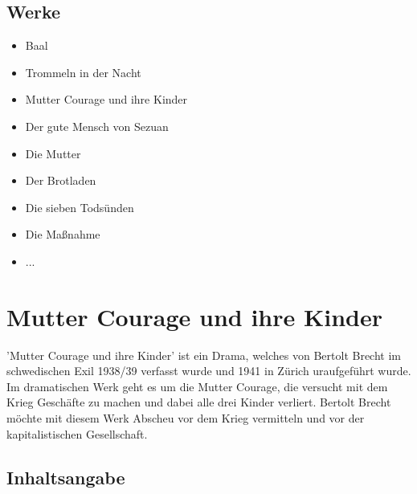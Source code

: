 \documentclass[a4paper]{article}
\begin{document}
	\subsection{Werke}

        \begin{itemize}
        \item Baal
	\item Trommeln in der Nacht
	\item Mutter Courage und ihre Kinder
        \item Der gute Mensch von Sezuan
        \item Die Mutter
        \item Der Brotladen
        \item Die sieben Todsünden
        \item Die Maßnahme
        \item ...
          
        \end{itemize}
        
        \section{Mutter Courage und ihre Kinder}

	'Mutter Courage und ihre Kinder' ist ein Drama, welches von Bertolt Brecht im schwedischen Exil 1938/39 verfasst wurde und 1941 in Zürich uraufgeführt wurde. Im dramatischen Werk geht es um die Mutter Courage, die versucht mit dem Krieg Geschäfte zu machen und dabei alle drei Kinder verliert. Bertolt Brecht möchte mit diesem Werk Abscheu vor dem Krieg vermitteln und vor der kapitalistischen Gesellschaft.
        
	\subsection{Inhaltsangabe}        
\end{document}
